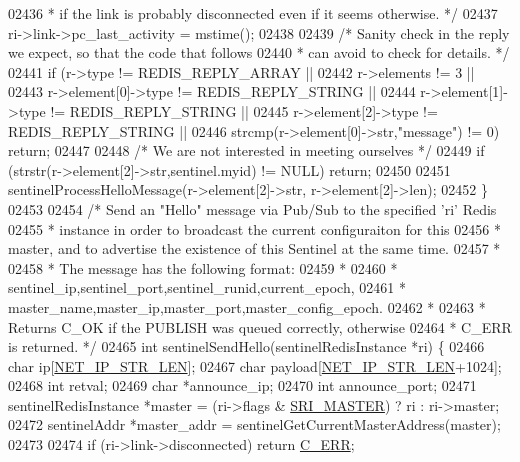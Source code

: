 \begin{DoxyCode}
{{{{{{{{{{{{{{{{{{{{{{{{{{{{{{{{{{{{{{{{{{{{{{{{{{{{{{02436 \textcolor{comment}{     * if the link is probably disconnected even if it seems otherwise. */}
02437     ri->link->pc\_last\_activity = mstime();
02438 
02439     \textcolor{comment}{/* Sanity check in the reply we expect, so that the code that follows}
02440 \textcolor{comment}{     * can avoid to check for details. */}
02441     \textcolor{keywordflow}{if} (r->type != REDIS\_REPLY\_ARRAY ||
02442         r->elements != 3 ||
02443         r->element[0]->type != REDIS\_REPLY\_STRING ||
02444         r->element[1]->type != REDIS\_REPLY\_STRING ||
02445         r->element[2]->type != REDIS\_REPLY\_STRING ||
02446         strcmp(r->element[0]->str,\textcolor{stringliteral}{"message"}) != 0) \textcolor{keywordflow}{return};
02447 
02448     \textcolor{comment}{/* We are not interested in meeting ourselves */}
02449     \textcolor{keywordflow}{if} (strstr(r->element[2]->str,sentinel.myid) != NULL) \textcolor{keywordflow}{return};
02450 
02451     sentinelProcessHelloMessage(r->element[2]->str, r->element[2]->len);
02452 \}
02453 
02454 \textcolor{comment}{/* Send an "Hello" message via Pub/Sub to the specified 'ri' Redis}
02455 \textcolor{comment}{ * instance in order to broadcast the current configuraiton for this}
02456 \textcolor{comment}{ * master, and to advertise the existence of this Sentinel at the same time.}
02457 \textcolor{comment}{ *}
02458 \textcolor{comment}{ * The message has the following format:}
02459 \textcolor{comment}{ *}
02460 \textcolor{comment}{ * sentinel\_ip,sentinel\_port,sentinel\_runid,current\_epoch,}
02461 \textcolor{comment}{ * master\_name,master\_ip,master\_port,master\_config\_epoch.}
02462 \textcolor{comment}{ *}
02463 \textcolor{comment}{ * Returns C\_OK if the PUBLISH was queued correctly, otherwise}
02464 \textcolor{comment}{ * C\_ERR is returned. */}
02465 \textcolor{keywordtype}{int} sentinelSendHello(sentinelRedisInstance *ri) \{
02466     \textcolor{keywordtype}{char} ip[\hyperlink{server_8h_ad97c5405ed22a94e9fcc10fba577d6c0}{NET\_IP\_STR\_LEN}];
02467     \textcolor{keywordtype}{char} payload[\hyperlink{server_8h_ad97c5405ed22a94e9fcc10fba577d6c0}{NET\_IP\_STR\_LEN}+1024];
02468     \textcolor{keywordtype}{int} retval;
02469     \textcolor{keywordtype}{char} *announce\_ip;
02470     \textcolor{keywordtype}{int} announce\_port;
02471     sentinelRedisInstance *master = (ri->flags & \hyperlink{sentinel_8c_a2ee83e5ff67b45746cd6a310f15334b2}{SRI\_MASTER}) ? ri : ri->master;
02472     sentinelAddr *master\_addr = sentinelGetCurrentMasterAddress(master);
02473 
02474     \textcolor{keywordflow}{if} (ri->link->disconnected) \textcolor{keywordflow}{return} \hyperlink{server_8h_af98ac28d5f4d23d7ed5985188e6fb7d1}{C\_ERR};
}}}}}}}}}}}}}}}}}}}}}}}}}}}}}}}}}}}}}}}}}}}}}}}}}}}}}}
\end{DoxyCode}
